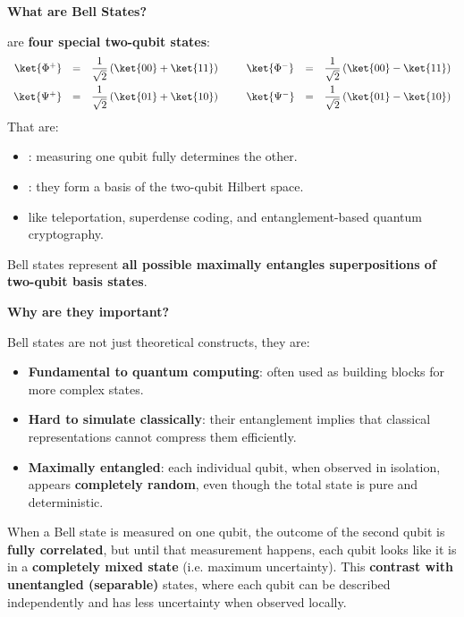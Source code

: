 \highspace
\begin{flushleft}
    \textcolor{Green3}{ \textbf{What are Bell States?}}
\end{flushleft}
 are \textbf{four special two-qubit states}:
\begin{equation}
    \begin{array}{rclcl}
        \ket{\Phi^{+}} & = & \dfrac{1}{\sqrt{2}} \left(\ket{00} + \ket{11} \right) \hspace{2.5em}
        \ket{\Phi^{-}} & = & \dfrac{1}{\sqrt{2}} \left(\ket{00} - \ket{11} \right) \\ [1em]
        \ket{\Psi^{+}} & = & \dfrac{1}{\sqrt{2}} \left(\ket{01} + \ket{10} \right) \hspace{2.5em}
        \ket{\Psi^{-}} & = & \dfrac{1}{\sqrt{2}} \left(\ket{01} - \ket{10} \right)
    \end{array}
\end{equation}
That are:
\begin{itemize}
    \item {}: measuring one qubit fully determines the other.
    \item {}: they form a basis of the two-qubit Hilbert space.
    \item {} like teleportation, superdense coding, and entanglement-based quantum cryptography.
\end{itemize}
Bell states represent \textbf{all possible maximally entangles superpositions of two-qubit basis states}.

\highspace
\begin{flushleft}
    \textcolor{Red2}{ \textbf{Why are they important?}}
\end{flushleft}
Bell states are not just theoretical constructs, they are:
\begin{itemize}
    \item \textbf{Fundamental to quantum computing}: often used as building blocks for more complex states.
    \item \textbf{Hard to simulate classically}: their entanglement implies that classical representations cannot compress them efficiently.
    \item \textbf{Maximally entangled}: each individual qubit, when observed in isolation, appears \textbf{completely random}, even though the total state is pure and deterministic.
\end{itemize}
When a Bell state is measured on one qubit, the outcome of the second qubit is \textbf{fully correlated}, but until that measurement happens, each qubit looks like it is in a \textbf{completely mixed state} (i.e. maximum uncertainty). This \textbf{contrast with unentangled (separable)} states, where each qubit can be described independently and has less uncertainty when observed locally.

